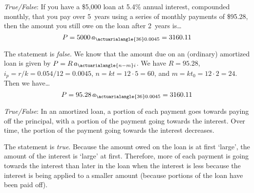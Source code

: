 \documentclass[11pt,letterpaper]{article}
\begin{document}
\quizsol \textit{True/False}: If you have a \$5,000 loan at 5.4\% annual interest, compounded monthly, that you pay over 5~years using a series of monthly payments of \$95.28, then the amount you still owe on the loan after 2~years is\dots
	\[
	P= 5000\, a_{\actuarialangle{36}0.0045}= 3160.11
	\] \pspace

\sol The statement is \textit{false}. We know that the amount due on an (ordinary) amortized loan is given by $P= R\, a_{\actuarialangle{n - m}i}$. We have $R= 95.28$, $i_p= r/k= 0.054/12= 0.0045$, $n= kt= 12 \cdot 5= 60$, and $m= kt_0= 12 \cdot 2= 24$. Then we have\dots
	\[
	P= 95.28\, a_{\actuarialangle{36}0.0045}= 3160.11
	\]



\quizsol \textit{True/False}: In an amortized loan, a portion of each payment goes towards paying off the principal, with a portion of the payment going towards the interest. Over time, the portion of the payment going towards the interest decreases. \pspace

\sol The statement is \textit{true}. Because the amount owed on the loan is at first `large', the amount of the interest is `large' at first. Therefore, more of each payment is going towards the interest than later in the loan when the interest is less because the interest is being applied to a smaller amount (because portions of the loan have been paid off). 
\end{document}
